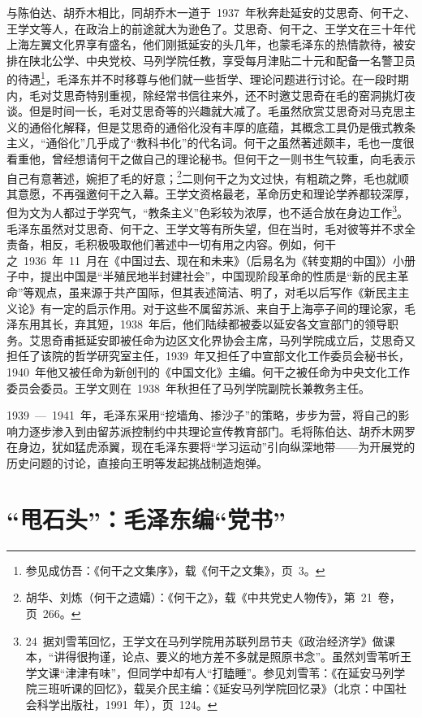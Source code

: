 与陈伯达、胡乔木相比，同胡乔木一道于~1937~年秋奔赴延安的艾思奇、何干之、王学文等人，在政治上的前途就大为逊色了。艾思奇、何干之、王学文在三十年代上海左翼文化界享有盛名，他们刚抵延安的头几年，也蒙毛泽东的热情款待，被安排在陕北公学、中央党校、马列学院任教，享受每月津贴二十元和配备一名警卫员的待遇\footnote{参见成仿吾：《何干之文集序》，载《何干之文集》，页~3。}，毛泽东并不时移尊与他们就一些哲学、理论问题进行讨论。在一段时期内，毛对艾思奇特别重视，除经常书信往来外，还不时邀艾思奇在毛的窑洞挑灯夜谈。但是时间一长，毛对艾思奇等的兴趣就大减了。毛虽然欣赏艾思奇对马克思主义的通俗化解释，但是艾思奇的通俗化没有丰厚的底蕴，其概念工具仍是俄式教条主义，“通俗化”几乎成了“教科书化”的代名词。何干之虽然著述颇丰，毛也一度很看重他，曾经想请何干之做自己的理论秘书。但何干之一则书生气较重，向毛表示自己有意著述，婉拒了毛的好意；\footnote{胡华、刘炼（何干之遗孀）：《何干之》，载《中共党史人物传》，第~21~卷，页~266。}二则何干之为文过快，有粗疏之弊，毛也就顺其意愿，不再强邀何干之入幕。王学文资格最老，革命历史和理论学养都较深厚，但为文为人都过于学究气，“教条主义”色彩较为浓厚，也不适合放在身边工作\footnote{24~据刘雪苇回忆，王学文在马列学院用苏联列昂节夫《政治经济学》做课本，“讲得很拘谨，论点、要义的地方差不多就是照原书念”。虽然刘雪苇听王学文课“津津有味”，但同学中却有人“打瞌睡”。参见刘雪苇：《在延安马列学院三班听课的回忆》，载吴介民主编：《延安马列学院回忆录》（北京：中国社会科学出版社，1991~年），页~124。}。毛泽东虽然对艾思奇、何干之、王学文等有所失望，但在当时，毛对彼等并不求全责备，相反，毛积极吸取他们著述中一切有用之内容。例如，何干之~1936~年~11~月在《中国过去、现在和未来》（后易名为《转变期的中国》）小册子中，提出中国是“半殖民地半封建社会”，中国现阶段革命的性质是“新的民主革命”等观点，虽来源于共产国际，但其表述简洁、明了，对毛以后写作《新民主主义论》有一定的启示作用。对于这些不属留苏派、来自于上海亭子间的理论家，毛泽东用其长，弃其短，1938~年后，他们陆续都被委以延安各文宣部门的领导职务。艾思奇甫抵延安即被任命为边区文化界协会主席，马列学院成立后，艾思奇又担任了该院的哲学研究室主任，1939~年又担任了中宣部文化工作委员会秘书长，1940~年他又被任命为新创刊的《中国文化》主编。何干之被任命为中央文化工作委员会委员。王学文则在~1938~年秋担任了马列学院副院长兼教务主任。

1939~—~1941~年，毛泽东采用“挖墙角、掺沙子”的策略，步步为营，将自己的影响力逐步渗入到由留苏派控制约中共理论宣传教育部门。毛将陈伯达、胡乔木网罗在身边，犹如猛虎添翼，现在毛泽东要将“学习运动”引向纵深地带——为开展党的历史问题的讨论，直接向王明等发起挑战制造炮弹。

\section{“甩石头”：毛泽东编“党书”}

